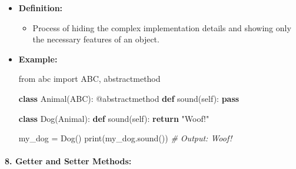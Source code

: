 \documentclass[11pt]{article}
\providecommand{\tightlist}{%
      \setlength{\itemsep}{0pt}\setlength{\parskip}{0pt}}
\newenvironment{Shaded}{}{}
\newcommand{\KeywordTok}[1]{\textcolor[rgb]{0.00,0.44,0.13}{\textbf{{#1}}}}
\newcommand{\StringTok}[1]{\textcolor[rgb]{0.25,0.44,0.63}{{#1}}}
\newcommand{\CommentTok}[1]{\textcolor[rgb]{0.38,0.63,0.69}{\textit{{#1}}}}
\newcommand{\NormalTok}[1]{{#1}}
\newcommand{\ImportTok}[1]{{#1}}
\newcommand{\VariableTok}[1]{\textcolor[rgb]{0.10,0.09,0.49}{{#1}}}
\newcommand{\ControlFlowTok}[1]{\textcolor[rgb]{0.00,0.44,0.13}{\textbf{{#1}}}}
\newcommand{\OperatorTok}[1]{\textcolor[rgb]{0.40,0.40,0.40}{{#1}}}
\newcommand{\BuiltInTok}[1]{{#1}}
\newcommand{\AttributeTok}[1]{\textcolor[rgb]{0.49,0.56,0.16}{{#1}}}
\begin{document}
\begin{itemize}
\item
  \textbf{Definition:}

  \begin{itemize}
  \tightlist
  \item
    Process of hiding the complex implementation details and showing
    only the necessary features of an object.
  \end{itemize}
\item
  \textbf{Example:}

\begin{Shaded}
\begin{Highlighting}[]
\ImportTok{from}\NormalTok{ abc }\ImportTok{import}\NormalTok{ ABC, abstractmethod}

\KeywordTok{class}\NormalTok{ Animal(ABC):}
    \AttributeTok{@abstractmethod}
    \KeywordTok{def}\NormalTok{ sound(}\VariableTok{self}\NormalTok{):}
        \ControlFlowTok{pass}

\KeywordTok{class}\NormalTok{ Dog(Animal):}
    \KeywordTok{def}\NormalTok{ sound(}\VariableTok{self}\NormalTok{):}
        \ControlFlowTok{return} \StringTok{"Woof!"}

\NormalTok{my_dog }\OperatorTok{=}\NormalTok{ Dog()}
\BuiltInTok{print}\NormalTok{(my_dog.sound())  }\CommentTok{# Output: Woof!}
\end{Highlighting}
\end{Shaded}
\end{itemize}

\paragraph{\texorpdfstring{8. \textbf{Getter and Setter
Methods:}}{8. Getter and Setter Methods:}}\label{getter-and-setter-methods}
\end{document}
